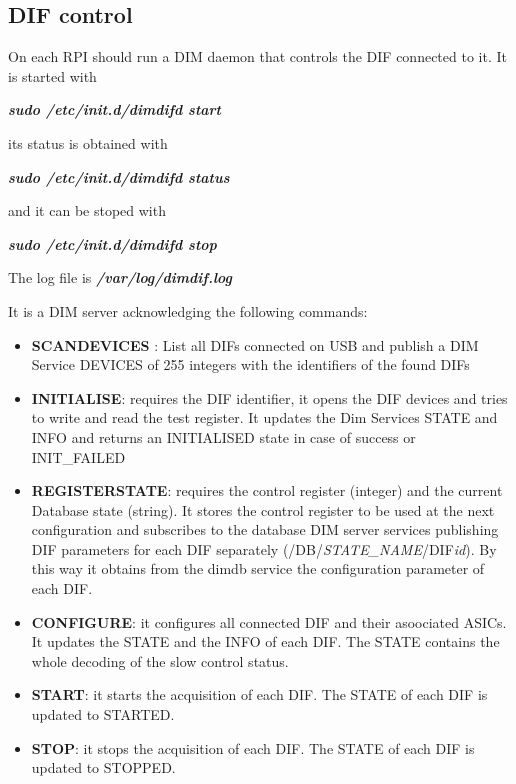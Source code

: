 \documentclass[english]{article}
\begin{document}
\subsection{DIF control}

On each RPI should run a DIM daemon that controls the DIF connected to it. It is started with

{\sl \bf sudo /etc/init.d/dimdifd start }

its status is obtained with 

{\sl \bf sudo /etc/init.d/dimdifd status }

and it can be stoped with

{\sl \bf sudo /etc/init.d/dimdifd stop }

The log file is {\sl \bf /var/log/dimdif.log }

It is a DIM server acknowledging the following commands:
\begin{itemize}
\item { \bf SCANDEVICES }: List all DIFs connected on USB and publish a DIM Service DEVICES of 255 integers with the identifiers of the found DIFs
\item {\bf INITIALISE}: requires the DIF identifier, it opens the DIF devices and tries to write and read the test register. It updates the Dim Services STATE and INFO and returns an INITIALISED state in case of success or INIT\_FAILED
\item {\bf REGISTERSTATE}: requires the control register (integer) and the current Database state (string). It stores the control register to be used at the next configuration and subscribes to the database DIM server services publishing DIF parameters for each DIF separately (/DB/{\sl STATE\_NAME}/DIF{\sl id}). By this way it obtains from the dimdb service the configuration parameter of each DIF.

\item {\bf CONFIGURE}: it configures all connected DIF and their asoociated ASICs. It updates the STATE and the INFO of each DIF. The STATE contains the whole decoding of the slow control status. 


\item {\bf START}: it starts the acquisition of each DIF. The STATE of each DIF is updated to STARTED.

\item {\bf STOP}: it stops the acquisition of each DIF. The STATE of each DIF is updated to STOPPED.

\end{itemize}
\end{document}
